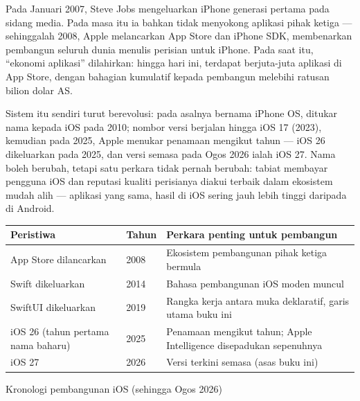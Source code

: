 


Pada Januari 2007, Steve Jobs mengeluarkan iPhone generasi pertama pada sidang media. Pada masa itu ia bahkan tidak menyokong aplikasi pihak ketiga — sehinggalah 2008, Apple melancarkan App Store dan iPhone SDK, membenarkan pembangun seluruh dunia menulis perisian untuk iPhone. Pada saat itu, “ekonomi aplikasi” dilahirkan: hingga hari ini, terdapat berjuta-juta aplikasi di App Store, dengan bahagian kumulatif kepada pembangun melebihi ratusan bilion dolar AS.

Sistem itu sendiri turut berevolusi: pada asalnya bernama iPhone OS, ditukar nama kepada iOS pada 2010; nombor versi berjalan hingga iOS 17 (2023), kemudian pada 2025, Apple menukar penamaan mengikut tahun — iOS 26 dikeluarkan pada 2025, dan versi semasa pada Ogos 2026 ialah iOS 27. Nama boleh berubah, tetapi satu perkara tidak pernah berubah: tabiat membayar pengguna iOS dan reputasi kualiti perisianya diakui terbaik dalam ekosistem mudah alih — aplikasi yang sama, hasil di iOS sering jauh lebih tinggi daripada di Android.

\begin{center}
\begin{tabularx}{\linewidth}{|X|X|X|}
\hline
\textbf{Peristiwa} & \textbf{Tahun} & \textbf{Perkara penting untuk pembangun} \tabularnewline
\hline
App Store dilancarkan & 2008 & Ekosistem pembangunan pihak ketiga bermula \tabularnewline
Swift dikeluarkan & 2014 & Bahasa pembangunan iOS moden muncul \tabularnewline
SwiftUI dikeluarkan & 2019 & Rangka kerja antara muka deklaratif, garis utama buku ini \tabularnewline
iOS 26 (tahun pertama nama baharu) & 2025 & Penamaan mengikut tahun; Apple Intelligence disepadukan sepenuhnya \tabularnewline
iOS 27 & 2026 & Versi terkini semasa (asas buku ini) \tabularnewline
\hline
\end{tabularx}
\end{center}

\begin{center}\small\color{gray}Kronologi pembangunan iOS (sehingga Ogos 2026)\end{center}

